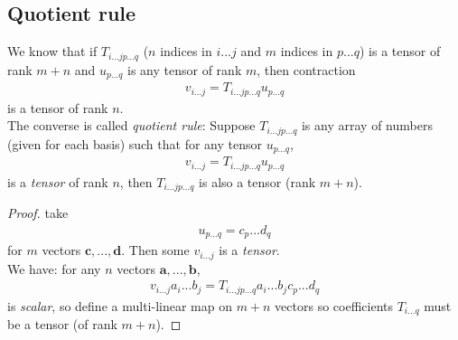 \documentclass[a4paper]{article}
\begin{document}
\subsection{Quotient rule}
We know that if $T_{i...jp...q}$ ($n$ indices in $i...j$ and $m$ indices in $p...q$) is a tensor of rank $m+n$ and $u_{p...q}$ is any tensor of rank $m$, then contraction
\begin{equation*}
\begin{aligned}
v_{i...j} = T_{i...jp...q} u_{p...q}
\end{aligned}
\end{equation*}
is a tensor of rank $n$.\\
The converse is called \emph{quotient rule}:
Suppose $T_{i...jp...q}$ is any array of numbers (given for each basis) such that for any tensor $u_{p...q}$,
\begin{equation*}
\begin{aligned}
v_{i...j} = T_{i...jp...q} u_{p...q}
\end{aligned}
\end{equation*}
is a \emph{tensor} of rank $n$, then $T_{i...jp...q}$ is also a tensor (rank $m+n$).
\begin{proof}
take
\begin{equation*}
\begin{aligned}
u_{p...q} = c_{p}...d_q
\end{aligned}
\end{equation*}
for $m$ vectors $\mathbf{c},...,\mathbf{d}$. Then some $v_{i...j}$ is a \emph{tensor}.\\
We have: for any $n$ vectors $\mathbf{a},...,\mathbf{b}$,
\begin{equation*}
\begin{aligned}
v_{i...j} a_i... b_j = T_{i...jp...q} a_i...b_j c_p...d_q
\end{aligned}
\end{equation*}
is \emph{scalar}, so define a multi-linear map on $m+n$ vectors so coefficients $T_{i...q}$ must be a tensor (of rank $m+n$).
\end{proof}
\end{document}
